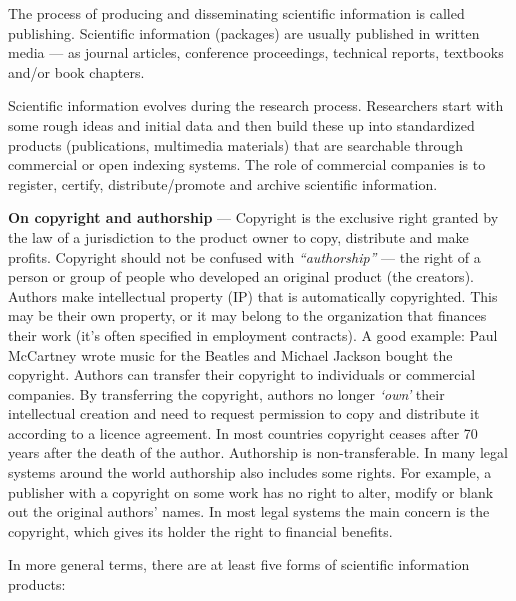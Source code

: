 \documentclass[graybox,envcountchap,sectrefs,UStrade]{svmono}
\newenvironment{fminipage}{\begin{Sbox}\begin{minipage}}{\end{minipage}\end{Sbox}\fbox{\TheSbox}}
\begin{document}
\begin{svgraybox}
The process of producing and disseminating scientific information is called publishing. Scientific information (packages) are usually published in written media --- as journal articles, conference proceedings, technical reports, textbooks and/or book chapters.
\end{svgraybox}\label{R:publishing}

Scientific information evolves during the research process. Research\-ers start with some rough ideas and initial data and then build these up into standardized products (publications, multimedia materials) that are searchable through commercial or open indexing systems. The role of commercial companies is to register, certify, distribute/promote and archive scientific information.\par

\bigskip
\begin{fminipage}{.9\textwidth}{\footnotesize{\textsf{\textbf{On copyright and authorship}} --- Copyright is the exclusive right granted by the law of a jurisdiction to the product owner to copy, distribute and make profits. Copyright should not be confused with \emph{``authorship''} --- the right of a person or group of people who developed an original product (the creators). Authors make intellectual property (IP) that is automatically copyrighted. This may be their own property, or it may belong to the organization that finances their work (it's often specified in employment contracts). A good example: Paul McCartney wrote music for the Beatles  and Michael Jackson bought the copyright. Authors can transfer their copyright to individuals or commercial companies. By transferring the copyright, authors no longer \emph{`own'} their intellectual creation and need to request permission to copy and distribute it according to a licence agreement. In most countries copyright ceases after 70 years after the death of the author. Authorship is non-transferable. In many legal systems around the world authorship also includes some rights. For example, a publisher with a copyright on some work has no right to alter, modify or blank out the original authors' names. In most legal systems the main concern is the copyright, which gives its holder the right to financial benefits.
}}
\end{fminipage}
\bigskip

In more general terms, there are at least five forms of scientific information products:
\end{document}
